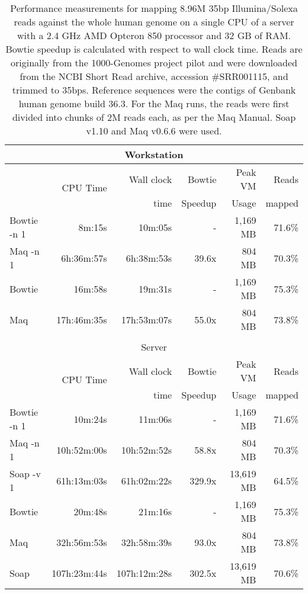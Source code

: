 \documentclass[letterpaper]{article}
\begin{document}
\begin{table}[tp]
\scriptsize
\begin{tabular}{lrrrrr}
\multicolumn{6}{c}{\small{Workstation}}\\[3pt]
\toprule
 & \multirow{2}{*}{CPU Time} & Wall clock & Bowtie  & Peak VM & Reads  \\
 &                           & time       & Speedup & Usage   & mapped \\[3pt]
\toprule
Bowtie -n 1 & 8m:15s & 10m:05s & - & 1,169 MB & 71.6\%\\\midrule
Maq -n 1 & 6h:36m:57s & 6h:38m:53s & 39.6x & 804 MB & 70.3\%\\\midrule
\midrule
Bowtie & 16m:58s & 19m:31s & - & 1,169 MB & 75.3\%\\\midrule
Maq & 17h:46m:35s & 17h:53m:07s & 55.0x & 804 MB & 73.8\%\\
\bottomrule\\[3pt]
\multicolumn{6}{c}{\small{Server}}\\[3pt]
\toprule
 & \multirow{2}{*}{CPU Time} & Wall clock & Bowtie  & Peak VM & Reads  \\
 &                           & time       & Speedup & Usage   & mapped \\[3pt]
\toprule
Bowtie -n 1 & 10m:24s & 11m:06s & - & 1,169 MB & 71.6\%\\\midrule
Maq -n 1 & 10h:52m:00s & 10h:52m:52s & 58.8x & 804 MB & 70.3\%\\\midrule
Soap -v 1 & 61h:13m:03s & 61h:02m:22s & 329.9x & 13,619 MB & 64.5\%\\\midrule
\midrule
Bowtie & 20m:48s & 21m:16s & - & 1,169 MB & 75.3\%\\\midrule
Maq & 32h:56m:53s & 32h:58m:39s & 93.0x & 804 MB & 73.8\%\\\midrule
Soap & 107h:23m:44s & 107h:12m:28s & 302.5x & 13,619 MB & 70.6\%\\
\bottomrule
\end{tabular}
\caption{Performance measurements for mapping 8.96M 35bp Illumina/Solexa reads against the whole human genome on a single CPU of a server with a 2.4 GHz AMD Opteron 850 processor and 32 GB of RAM. Bowtie speedup is calculated with respect to wall clock time. Reads are originally from the 1000-Genomes project pilot and were downloaded from the NCBI Short Read archive, accession \#SRR001115, and trimmed to 35bps. Reference sequences were the contigs of Genbank human genome build 36.3. For the Maq runs, the reads were first divided into chunks of 2M reads each, as per the Maq Manual. Soap v1.10 and Maq v0.6.6 were used.}
\end{table}
\end{document}
